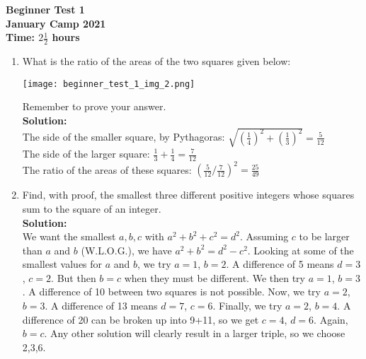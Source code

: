 \documentclass{article}
\begin{document}
\thispagestyle{empty}

\begin{center}
  \textbf{\Large Beginner Test 1}
  \\ \vspace{1em}
  \textbf{\large January Camp 2021}
  \\ \vspace{1em}
  \textbf{\large Time: $2\frac{1}{2}$ hours}
\end{center}

\vspace{24pt}

\begin{enumerate}[1.]


\item What is the ratio of the areas of the two squares given below:
\begin{center}
	\texttt{[image: beginner\_test\_1\_img\_2.png]}	
\end{center}
Remember to prove your answer.\\%

\textbf{Solution:}\\
The side of the smaller square, by Pythagoras: $\sqrt{(\frac{1}{4})^2+(\frac{1}{3})^2}=\frac{5}{12}$\\
The side of the larger square: $\frac{1}{3}+\frac{1}{4}=\frac{7}{12}$\\
The ratio of the areas of these squares: $(\frac{5}{12}/\frac{7}{12})^2=\frac{25}{49}$\\



\item Find, with proof, the smallest three different positive integers whose squares sum to the square of an integer.\\ %

\textbf{Solution:}\\
We want the smallest $a,b,c$ with $a^2+b^2+c^2=d^2$. Assuming $c$ to be larger than $a$ and $b$ (W.L.O.G.), we have $a^2+b^2=d^2-c^2$. Looking at some of the smallest values for $a$ and $b$, we try $a=1$, $b=2$. A difference of 5 means $d=3$, $c=2$. But then $b=c$ when they must be different. We then try $a=1$, $b=3$. A difference of 10 between two squares is not possible. Now, we try $a=2$, $b=3$. A difference of 13 means $d=7$, $c=6$. Finally, we try $a=2$, $b=4$. A difference of 20 can be broken up into 9+11, so we get $c=4$, $d=6$. Again, $b=c$. Any other solution will clearly result in a larger triple, so we choose 2,3,6.\\




\end{enumerate}
\end{document}
